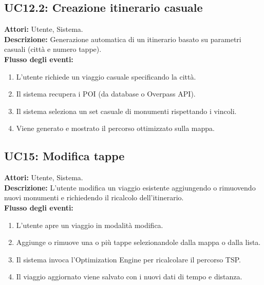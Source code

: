 \subsection*{UC12.2: Creazione itinerario casuale}
\textbf{Attori:} Utente, Sistema.\\
\textbf{Descrizione:} Generazione automatica di un itinerario basato su parametri casuali (città e numero tappe).\\
\textbf{Flusso degli eventi:}
\begin{enumerate}
    \item L'utente richiede un viaggio casuale specificando la città.
    \item Il sistema recupera i POI (da database o Overpass API).
    \item Il sistema seleziona un set casuale di monumenti rispettando i vincoli.
    \item Viene generato e mostrato il percorso ottimizzato sulla mappa.
\end{enumerate}

\subsection*{UC15: Modifica tappe}
\textbf{Attori:} Utente, Sistema.\\
\textbf{Descrizione:} L'utente modifica un viaggio esistente aggiungendo o rimuovendo nuovi monumenti e richiedendo il ricalcolo dell'itinerario.\\
\textbf{Flusso degli eventi:}
\begin{enumerate}
    \item L'utente apre un viaggio in modalità modifica.
    \item Aggiunge o rimuove una o più tappe selezionandole dalla mappa o dalla lista.
    \item Il sistema invoca l'Optimization Engine per ricalcolare il percorso TSP.
    \item Il viaggio aggiornato viene salvato con i nuovi dati di tempo e distanza.
\end{enumerate}
